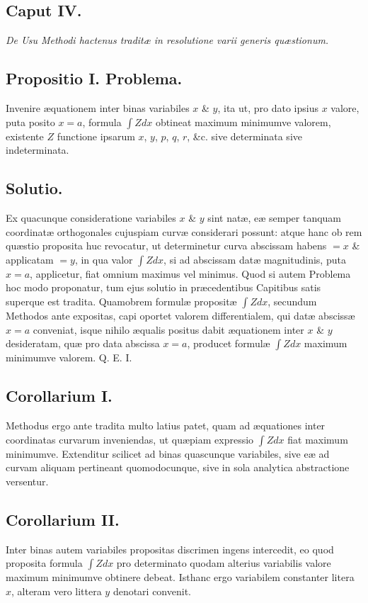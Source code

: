 \subsection*{Caput IV.}
\textit{De Usu Methodi hactenus traditæ in resolutione varii generis quæstionum.}
\subsection*{Propositio I. Problema.}
Invenire æquationem inter binas variabiles $x$ \& $y$, ita ut, pro dato ipsius $x$ valore, puta posito $x=a$, formula $\int Zdx$ obtineat maximum minimumve valorem, existente $Z$ functione ipsarum $x$, $y$, $p$, $q$, $r$, \&c. sive determinata sive indeterminata.
\subsection*{Solutio.}
Ex quacunque consideratione variabiles $x$ \& $y$ sint natæ, eæ semper tanquam coordinatæ orthogonales cujuspiam curvæ considerari possunt: atque hanc ob rem quæstio proposita huc revocatur, ut determinetur curva abscissam habens $=x$ \& applicatam $=y$, in qua valor $\int Zdx$, si ad abscissam datæ magnitudinis, puta $x=a$, applicetur, fiat omnium maximus vel minimus. Quod si autem Problema hoc modo proponatur, tum ejus solutio in præcedentibus Capitibus satis superque est tradita. Quamobrem formulæ propositæ $\int Zdx$, secundum Methodos ante expositas, capi oportet valorem differentialem, qui datæ abscissæ $x=a$ conveniat, isque nihilo æqualis positus dabit æquationem inter $x$ \& $y$ desideratam, quæ pro data abscissa $x=a$, producet formulæ $\int Zdx$ maximum minimumve valorem. Q. E. I.
\subsection*{Corollarium I.}
Methodus ergo ante tradita multo latius patet, quam ad æquationes inter coordinatas curvarum inveniendas, ut quæpiam expressio $\int Zdx$ fiat maximum minimumve. Extenditur scilicet ad binas quascunque variabiles, sive eæ ad curvam aliquam pertineant quomodocunque, sive in sola analytica abstractione versentur.
\subsection*{Corollarium II.}
Inter binas autem variabiles propositas discrimen ingens intercedit, eo quod proposita formula $\int Zdx$ pro determinato quodam alterius variabilis valore maximum minimumve obtinere debeat. Isthanc ergo variabilem constanter litera $x$, alteram vero littera $y$ denotari convenit.
